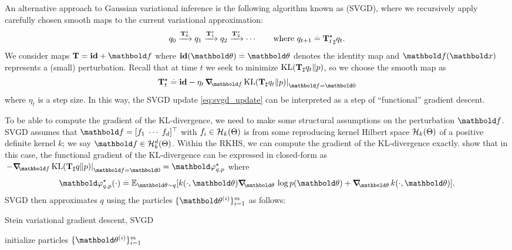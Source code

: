 An alternative approach to Gaussian variational inference is the following algorithm known as  (SVGD), where we recursively apply carefully chosen smooth maps to the current variational approximation: \begin{align}
  q_0 \xrightarrow{\mathbf{T}_0^\star} q_1 \xrightarrow{\mathbf{T}_1^\star} q_2 \xrightarrow{\mathbf{T}_2^\star} \cdots \qquad\text{where $q_{t+1} \overset{.}{=} {\mathbf{T}_t^\star}_\sharp q_t$}. \label{eq:svgd_sketch}
\end{align}
We consider maps $\vT = \rvec{id} + \vf$ where $\rvec{id}(\vtheta) \defeq \vtheta$ denotes the identity map and $\vf(\vx)$ represents a (small) perturbation.
Recall that at time $t$ we seek to minimize $\KL{\pf{\vT}{q_t}}{p}$, so we choose the smooth map as \begin{align}
  \opt{\vT_t} \defeq \rvec{id} - \eta_t\! \left. \grad_\vf \KL{\pf{\vT}{q_t}}{p} \right\rvert_{\vf = \vzero} \label{eq:svgd_update}
\end{align} where $\eta_t$ is a step size.
In this way, the SVGD update \eqref{eq:svgd_update} can be interpreted as a step of ``functional'' gradient descent.

To be able to compute the gradient of the KL-divergence, we need to make some structural assumptions on the perturbation $\vf$.
SVGD assumes that $\vf = \transpose{[f_1 \; \cdots \; f_d]}$ with $f_i \in \mathcal{H}_k(\Theta)$ is from some reproducing kernel Hilbert space $\mathcal{H}_k(\Theta)$ of a positive definite kernel $k$; we say $\vf \in \spH_k^d(\Theta)$.
Within the RKHS, we can compute the gradient of the KL-divergence exactly.
\cite{liu2016stein} show that in this case, the functional gradient of the KL-divergence can be expressed in closed-form as $\left. -\grad_\vf \KL{\pf{\vT}{q}}{p} \right\rvert_{\vf = \vzero} = \opt{\vvarphi_{q,p}}$ where \begin{align}
  \opt{\vvarphi_{q,p}}(\cdot) \defeq \E[\vtheta \sim q]{k(\cdot,\vtheta) \grad_{\vtheta} \log p(\vtheta) + \grad_{\vtheta} k(\cdot,\vtheta)}.
\end{align}
SVGD then approximates $q$ using the particles $\{\vtheta^{(i)}\}_{i=1}^m$ as follows:

\begin{algorithm}
  \caption{Stein variational gradient descent, SVGD}\label{alg:svgd}
  initialize particles $\{\vtheta^{(i)}\}_{i=1}^m$\;
\end{algorithm}

